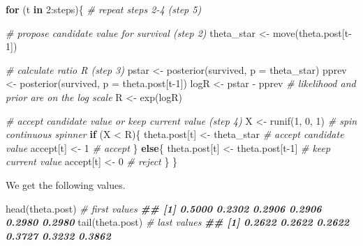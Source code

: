\documentclass[
  12pt,
]{krantz}
\newenvironment{Shaded}{\begin{snugshade}}{\end{snugshade}}
\newcommand{\AttributeTok}[1]{\textcolor[rgb]{0.77,0.63,0.00}{#1}}
\newcommand{\CommentTok}[1]{\textcolor[rgb]{0.56,0.35,0.01}{\textit{#1}}}
\newcommand{\ControlFlowTok}[1]{\textcolor[rgb]{0.13,0.29,0.53}{\textbf{#1}}}
\newcommand{\DecValTok}[1]{\textcolor[rgb]{0.00,0.00,0.81}{#1}}
\newcommand{\DocumentationTok}[1]{\textcolor[rgb]{0.56,0.35,0.01}{\textbf{\textit{#1}}}}
\newcommand{\FunctionTok}[1]{\textcolor[rgb]{0.00,0.00,0.00}{#1}}
\newcommand{\NormalTok}[1]{#1}
\newcommand{\OtherTok}[1]{\textcolor[rgb]{0.56,0.35,0.01}{#1}}
\newcommand{\SpecialCharTok}[1]{\textcolor[rgb]{0.00,0.00,0.00}{#1}}
\begin{document}
\begin{Shaded}
\begin{Highlighting}[]
\ControlFlowTok{for}\NormalTok{ (t }\ControlFlowTok{in} \DecValTok{2}\SpecialCharTok{:}\NormalTok{steps)\{ }\CommentTok{\# repeat steps 2{-}4 (step 5)}
  
  \CommentTok{\# propose candidate value for survival (step 2)}
\NormalTok{  theta\_star }\OtherTok{\textless{}{-}} \FunctionTok{move}\NormalTok{(theta.post[t}\DecValTok{{-}1}\NormalTok{])}
  
  \CommentTok{\# calculate ratio R (step 3)}
\NormalTok{  pstar }\OtherTok{\textless{}{-}} \FunctionTok{posterior}\NormalTok{(survived, }\AttributeTok{p =}\NormalTok{ theta\_star)  }
\NormalTok{  pprev }\OtherTok{\textless{}{-}} \FunctionTok{posterior}\NormalTok{(survived, }\AttributeTok{p =}\NormalTok{ theta.post[t}\DecValTok{{-}1}\NormalTok{])}
\NormalTok{  logR }\OtherTok{\textless{}{-}}\NormalTok{ pstar }\SpecialCharTok{{-}}\NormalTok{ pprev }\CommentTok{\# likelihood and prior are on the log scale}
\NormalTok{  R }\OtherTok{\textless{}{-}} \FunctionTok{exp}\NormalTok{(logR)}
  
  \CommentTok{\# accept candidate value or keep current value (step 4)}
\NormalTok{  X }\OtherTok{\textless{}{-}} \FunctionTok{runif}\NormalTok{(}\DecValTok{1}\NormalTok{, }\DecValTok{0}\NormalTok{, }\DecValTok{1}\NormalTok{) }\CommentTok{\# spin continuous spinner}
  \ControlFlowTok{if}\NormalTok{ (X }\SpecialCharTok{\textless{}}\NormalTok{ R)\{}
\NormalTok{    theta.post[t] }\OtherTok{\textless{}{-}}\NormalTok{ theta\_star }\CommentTok{\# accept candidate value}
\NormalTok{    accept[t] }\OtherTok{\textless{}{-}} \DecValTok{1} \CommentTok{\# accept}
\NormalTok{  \}}
  \ControlFlowTok{else}\NormalTok{\{}
\NormalTok{    theta.post[t] }\OtherTok{\textless{}{-}}\NormalTok{ theta.post[t}\DecValTok{{-}1}\NormalTok{] }\CommentTok{\# keep current value}
\NormalTok{    accept[t] }\OtherTok{\textless{}{-}} \DecValTok{0} \CommentTok{\# reject}
\NormalTok{  \}}
\NormalTok{\}}
\end{Highlighting}
\end{Shaded}

We get the following values.

\begin{Shaded}
\begin{Highlighting}[]
\FunctionTok{head}\NormalTok{(theta.post) }\CommentTok{\# first values}
\DocumentationTok{\#\# [1] 0.5000 0.2302 0.2906 0.2906 0.2980 0.2980}
\FunctionTok{tail}\NormalTok{(theta.post) }\CommentTok{\# last values}
\DocumentationTok{\#\# [1] 0.2622 0.2622 0.2622 0.3727 0.3232 0.3862}
\end{Highlighting}
\end{Shaded}
\end{document}
